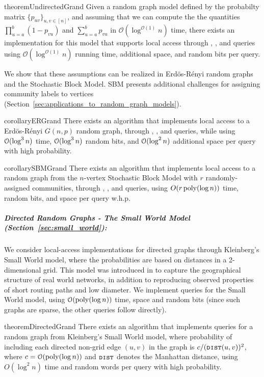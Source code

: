 \begin{restatable}{theorem}{UndirectedGrand}
\label{thm:grand}
Given a random graph model defined by the probabilty matrix $\{ p_{uv}\}_{u,v\in [n]}$,
and assuming that we can compute the the quantities $\prod_{u=a}^b (1-p_{vu})$ and $\sum_{u=a}^b p_{vu}$ in $\mathcal O(\log^{\mathcal O(1)} n)$ time,
there exists an implementation for this model that supports local access through , ,
and  queries using $\mathcal O(\log^{\mathcal O(1)} n)$ running time, additional space, and random bits per query.
\end{restatable}

We show that these assumptions can be realized in Erd\"os-R\'enyi random graphs and the Stochastic Block Model.
SBM presents additional challenges for assigning community labels to vertices (Section~\ref{sec:applications_to_random_graph_models}).

\begin{restatable}{corollary}{ERGrand}
There exists an algorithm that implements local access to a Erd\"{o}s-R\'{e}nyi $G(n,p)$ random graph,
through , , and  queries,
while using $\mathcal{O}(\log^3 n)$ time, $\mathcal{O}(\log^3 n)$ random bits, and $\mathcal{O}(\log^2 n)$ additional space per query with high probability.
\end{restatable}

\begin{restatable}{corollary}{SBMGrand}\label{cor:sbm-construct}
There exists an algorithm that implements local access to a random graph from the $n$-vertex Stochastic Block Model
with $r$ randomly-assigned communities,
through , , and  queries,
using $O(r\,\mathrm{poly}(\log n))$ time, random bits, and space per query w.h.p.
\end{restatable}




\subparagraph*{Directed Random Graphs - The Small World Model (Section~\ref{sec:small_world}):}
\label{par:directed_random_graphs}
We consider local-access implementations for directed graphs through Kleinberg's Small World model,
where the probabilities are based on distances in a 2-dimensional grid.
This model was introduced in \cite{kleinberg} to capture the geographical structure of real world networks,
in addition to reproducing observed properties of short routing paths and low diameter.
We implement  queries for the Small World model,
using $\mathcal{O}(\mathrm{poly}(\log n))$ time, space and random bits (since such graphs are sparse, the other queries follow directly).
\begin{restatable}{theorem}{DirectedGrand}\label{DirectedGrand}
There exists an algorithm that implements  queries for a random graph from Kleinberg's Small World model,
where probability of including each directed non-grid edge $(u,v)$ in the graph is $c/(\texttt{\textsc{dist}}(u,v))^2$,
where $c = \mathcal O(\mathrm{poly}(\log n))$ and $\texttt{\textsc{dist}}$ denotes the Manhattan distance,
using $O(\log^2 n)$ time and random words per query with high probability.
\end{restatable}





